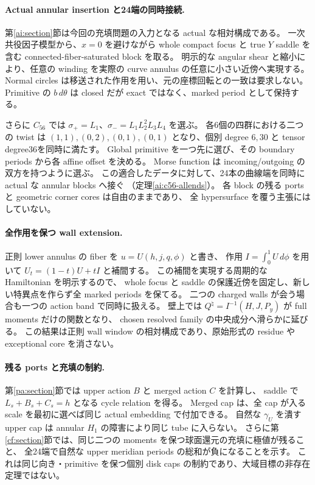 \documentclass[11pt,a4paper]{article}
\theoremstyle{definition}
\begin{document}
\paragraph{Actual annular insertion と24端の同時接続.}
第\ref{ai:section}節は今回の充填問題の入力となる actual な相対構成である。
一次共役因子模型から、$x=0$ を避けながら whole compact focus と true $Y$ saddle を含む
connected-fiber-saturated block を取る。
明示的な angular shear と縮小により、任意の winding を実際の curve annulus の任意に小さい近傍へ実現する。
Normal circles は移送された作用を用い、元の座標回転との一致は要求しない。
Primitive の $b\,d\theta$ は closed だが exact ではなく、marked period として保持する。

さらに $C_{56}$ では
$\sigma_+=L_1$、$\sigma_-=L_1L_2^2L_3L_4$ を選ぶ。
各6個の四群における二つの twist は
$(1,1),(0,2),(0,1),(0,1)$ となり、個別 degree $6,30$ と tensor degree36を同時に満たす。
Global primitive を一つ先に選び、その boundary periods から各 affine offset を決める。
Morse function は incoming/outgoing の双方を持つように選ぶ。
この適合したデータに対して、24本の曲線端を同時に actual な annular blocks へ接ぐ
（定理\ref{ai:c56-allends}）。
各 block の残る ports と geometric corner cores は自由のままであり、
全 hypersurface を覆う主張にはしていない。

\paragraph{全作用を保つ wall extension.}
正則 lower annulus の fiber を $u=U(h,j,q,\phi)$ と書き、
作用 $I=\int_0^1U\,d\phi$ を用いて $U_t=(1-t)U+tI$ と補間する。
この補間を実現する周期的な Hamiltonian を明示するので、
whole focus と saddle の保護近傍を固定し、新しい特異点を作らず全 marked periods を保てる。
二つの charged walls が会う場合も一つの action band で同時に扱える。
壁上では $Q^\natural=I^{-1}(H,J,P_y)$ が full moments だけの関数となり、
chosen resolved family の中央成分へ滑らかに延びる。
この結果は正則 wall window の相対構成であり、原始形式の residue や exceptional core を消さない。

\paragraph{残る ports と充填の制約.}
第\ref{pa:section}節では upper action $B$ と merged action $C$ を計算し、
saddle で $L_s+B_s+C_s=h$ となる cycle relation を得る。
Merged cap は、全 cap が入る scale を最初に選べば同じ actual embedding で付加できる。
自然な $\gamma_U$ を潰す upper cap は annular $H_1$ の障害により同じ tube に入らない。
さらに第\ref{cf:section}節では、同じ二つの moments を保つ球面還元の充填に極値が残ること、
全24端で自然な upper meridian periods の総和が負になることを示す。
これは同じ向き・primitive を保つ個別 disk caps の制約であり、大域目標の非存在定理ではない。
\end{document}
